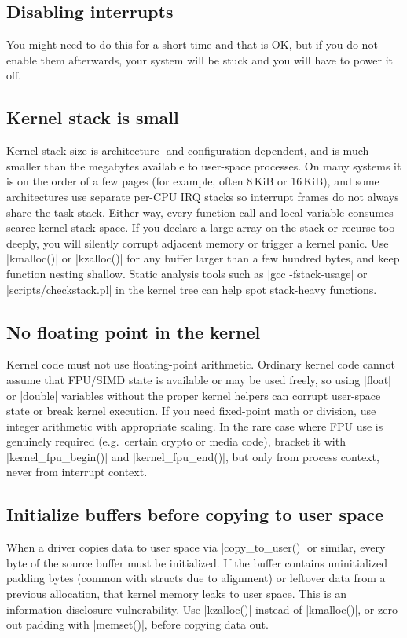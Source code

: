 \documentclass[10pt, oneside]{book}
\begin{document}
\subsection{Disabling interrupts}
\label{sec:disabling_interrupts}
You might need to do this for a short time and that is OK, but if you do not enable them afterwards, your system will be stuck and you will have to power it off.

\subsection{Kernel stack is small}
\label{sec:stack_limit}
Kernel stack size is architecture- and configuration-dependent, and is much smaller than the megabytes available to user-space processes.
On many systems it is on the order of a few pages (for example, often 8\,KiB or 16\,KiB), and some architectures use separate per-CPU IRQ stacks so interrupt frames do not always share the task stack.
Either way, every function call and local variable consumes scarce kernel stack space.
If you declare a large array on the stack or recurse too deeply, you will silently corrupt adjacent memory or trigger a kernel panic.
Use \cpp|kmalloc()| or \cpp|kzalloc()| for any buffer larger than a few hundred bytes, and keep function nesting shallow.
Static analysis tools such as \sh|gcc -fstack-usage| or \sh|scripts/checkstack.pl| in the kernel tree can help spot stack-heavy functions.

\subsection{No floating point in the kernel}
\label{sec:no_fp}
Kernel code must not use floating-point arithmetic.
Ordinary kernel code cannot assume that FPU/SIMD state is available or may be used freely, so using \cpp|float| or \cpp|double| variables without the proper kernel helpers can corrupt user-space state or break kernel execution.
If you need fixed-point math or division, use integer arithmetic with appropriate scaling.
In the rare case where FPU use is genuinely required (e.g.\ certain crypto or media code), bracket it with \cpp|kernel_fpu_begin()| and \cpp|kernel_fpu_end()|, but only from process context, never from interrupt context.

\subsection{Initialize buffers before copying to user space}
\label{sec:preinit_buffer}
When a driver copies data to user space via \cpp|copy_to_user()| or similar, every byte of the source buffer must be initialized.
If the buffer contains uninitialized padding bytes (common with structs due to alignment) or leftover data from a previous allocation, that kernel memory leaks to user space.
This is an information-disclosure vulnerability.
Use \cpp|kzalloc()| instead of \cpp|kmalloc()|, or zero out padding with \cpp|memset()|, before copying data out.
\end{document}
